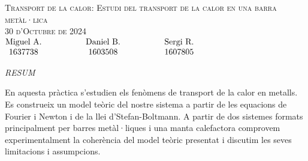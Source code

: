 \documentclass[12pt,twosides,onecolumn,openany]{article}
\begin{document}
\begin{center}
    {\Large \textsc{Transport de la calor: Estudi del transport de la calor en una barra metàl·lica}}\\
    \vspace{0.2cm}
    \textsc{30 d'Octubre de 2024}\\
    \vspace{0.2cm}
    $\begin{matrix} 
    \text{Miguel A.} \hspace{1.5cm} & \text{Daniel B.} & \hspace{1.5cm} \text{Sergi R.}\\1637738 \hspace{1.5cm} & 1603508 & \hspace{1.5cm} 1607805
    \end{matrix}$
\end{center}
\begin{center}
    \textsc{\textit{RESUM}}
\end{center}
En aquesta pràctica s'estudien els fenòmens de transport de la calor en metalls. Es construeix un model teòric del nostre sistema a partir de les equacions de Fourier i Newton i de la llei d'Stefan-Boltmann. A partir de dos sistemes formats principalment per barres metàl·liques i una manta calefactora comprovem experimentalment la coherència del model teòric presentat i discutim les seves limitacions i assumpcions. 
\vspace{0.5cm}
\end{document}
